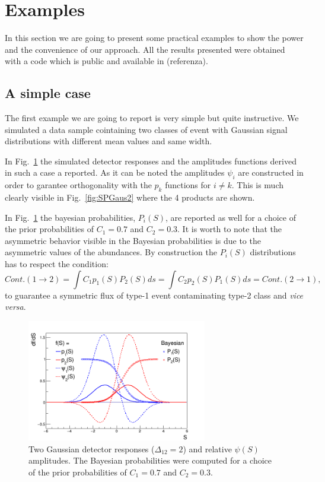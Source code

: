 \section{Examples}
In this section we are going to present some practical examples
to show the power and the convenience of our approach.
All the results presented were obtained with a code which is public and
available in (referenza).
\subsection{A simple case}
The first example we are going to report is very simple but quite instructive.
We simulated a data sample cointaining two classes of event with Gaussian
signal distributions with different mean values and same width.

In Fig.~\ref{fig:Gaus2} the simulated detector responses and the amplitudes
functions derived in such a case a reported. As it can be noted the amplitudes
$\psi_{i}$ are constructed in order to garantee orthogonality with the $p_{k}$
functions for $i \neq k$.
This is much clearly visible in Fig.~\ref{fig:SPGaus2} where the 4 products
are shown.

In Fig.~\ref{fig:Gaus2} the bayesian probabilities,
$P_{i}(S)$, are reported as well for a choice of the prior probabilities of
$C_{1}=0.7$ and $C_{2}=0.3$. It is worth to note that the asymmetric behavior
visible in the Bayesian probabilities is due to the asymmetric values of the
abundances. By construction the $P_{i}(S)$ distributions has to respect the
condition:
\begin{equation} 
\label{Sec3:BayesCond}
Cont. (1\rightarrow 2) = \int C_{1} p_{1}(S) P_{2}(S) ds = \int
C_{2} p_{2}(S) P_{1}(S) ds = Cont. (2\rightarrow 1),
\end{equation}
to guarantee a symmetric flux of type-1 event contaminating type-2 class and 
{\it vice versa}.

\begin{figure}[!htb]
\centering
\includegraphics[width=0.7\textwidth]{../png/figGaus2.png}
\caption{Two Gaussian detector responses ($\Delta_{12} = 2$) and relative
  $\psi(S)$ amplitudes. The Bayesian probabilities were computed for a choice
  of the prior probabilities of $C_{1}=0.7$ and $C_{2}=0.3$.}
\label{fig:Gaus2}
\end{figure}

